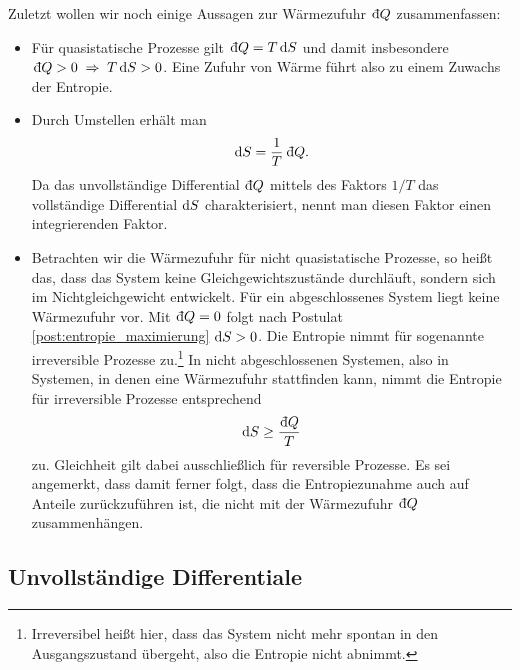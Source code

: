 Zuletzt wollen wir noch einige Aussagen zur Wärmezufuhr $\udiff Q$ zusammenfassen:
\begin{itemize}
    \item Für quasistatische Prozesse gilt $\udiff Q=T\diff S$ und damit insbesondere $\udiff Q>0\implication T\diff S>0$. Eine Zufuhr von Wärme führt also zu einem Zuwachs der Entropie.
    \item Durch Umstellen erhält man
          \begin{align*}
              \diff S = \frac{1}{T}\udiff Q.
          \end{align*}
          Da das unvollständige Differential $\udiff Q$ mittels des Faktors $1/T$ das vollständige Differential $\mathop{}\!\mathrm{d} S$ charakterisiert, nennt man diesen Faktor einen integrierenden Faktor.
    \item Betrachten wir die Wärmezufuhr für nicht quasistatische Prozesse, so heißt das, dass das System keine Gleichgewichtszustände durchläuft, sondern sich im Nichtgleichgewicht entwickelt. Für ein abgeschlossenes System liegt keine Wärmezufuhr vor. Mit $\udiff Q=0$ folgt nach Postulat \ref{post:entropie_maximierung} $\mathop{}\!\mathrm{d} S >0$. Die Entropie nimmt für sogenannte irreversible Prozesse zu.\footnote{Irreversibel heißt hier, dass das System nicht mehr spontan in den Ausgangszustand übergeht, also die Entropie nicht abnimmt.} In nicht abgeschlossenen Systemen, also in Systemen, in denen eine Wärmezufuhr stattfinden kann, nimmt die Entropie für irreversible Prozesse entsprechend
          \begin{align*}
              \diff S\geq \frac{\udiff Q}{T}
          \end{align*}
          zu.
          Gleichheit gilt dabei ausschließlich für reversible Prozesse. Es sei angemerkt, dass damit ferner folgt, dass die Entropiezunahme auch auf Anteile zurückzuführen ist, die nicht mit der Wärmezufuhr $\udiff Q$ zusammenhängen.
\end{itemize}

\subsection{Unvollständige Differentiale}

